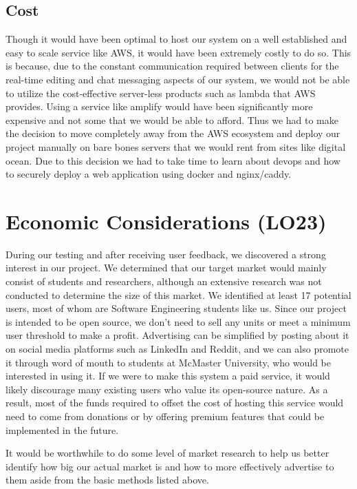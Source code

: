 \documentclass{article}
\begin{document}
	\subsection{Cost}
	
	Though it would have been optimal to host our system on a well established and easy to scale service like AWS, it would have been extremely costly to do so. This is because, due to the constant communication required between clients for the real-time editing and chat messaging aspects of our system, we would not be able to utilize the cost-effective server-less products such as lambda that AWS provides. Using a service like amplify would have been significantly more expensive and not some that we would be able to afford. Thus we had to make the decision to move completely away from the AWS ecosystem and deploy our project manually on bare bones servers that we would rent from sites like digital ocean. Due to this decision we had to take time to learn about devops and how to securely deploy a web application using docker and nginx/caddy.
	
	\section{Economic Considerations (LO23)}
	
	During our testing and after receiving user feedback, we discovered a strong interest in our project. We determined that our target market would mainly consist of students and researchers, although an extensive research was not conducted to determine the size of this market. We identified at least 17 potential users, most of whom are Software Engineering students like us. Since our project is intended to be open source, we don't need to sell any units or meet a minimum user threshold to make a profit. Advertising can be simplified by posting about it on social media platforms such as LinkedIn and Reddit, and we can also promote it through word of mouth to students at McMaster University, who would be interested in using it. If we were to make this system a paid service, it would likely discourage many existing users who value its open-source nature. As a result, most of the funds required to offset the cost of hosting this service would need to come from donations or by offering premium features that could be implemented in the future.
	
	\noindent It would be worthwhile to do some level of market research to help us better identify how big our actual market is and how to more effectively advertise to them aside from the basic methods listed above.
	
\end{document}
